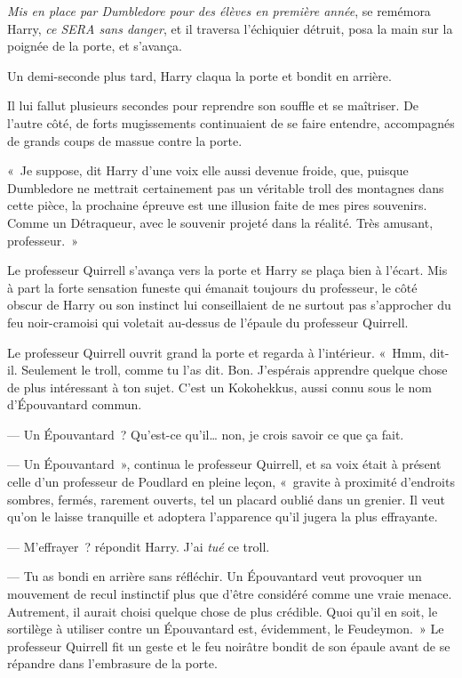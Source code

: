 \emph{Mis en place par Dumbledore pour des élèves en première année}, se remémora Harry, \emph{ce SERA sans danger}, et il traversa l'échiquier détruit, posa la main sur la poignée de la porte, et s'avança.

\later

Un demi-seconde plus tard, Harry claqua la porte et bondit en arrière.

Il lui fallut plusieurs secondes pour reprendre son souffle et se maîtriser.
De l'autre côté, de forts mugissements continuaient de se faire entendre, accompagnés de grands coups de massue contre la porte.

«~Je suppose, dit Harry d'une voix elle aussi devenue froide, que, puisque Dumbledore ne mettrait certainement pas un véritable troll des montagnes dans cette pièce, la prochaine épreuve est une illusion faite de mes pires souvenirs.
Comme un Détraqueur, avec le souvenir projeté dans la réalité.
Très amusant, professeur.~»

Le professeur Quirrell s'avança vers la porte et Harry se plaça bien à l'écart.
Mis à part la forte sensation funeste qui émanait toujours du professeur, le côté obscur de Harry ou son instinct lui conseillaient de ne surtout pas s'approcher du feu noir-cramoisi qui voletait au-dessus de l'épaule du professeur Quirrell.

Le professeur Quirrell ouvrit grand la porte et regarda à l'intérieur.
«~Hmm, dit-il.
Seulement le troll, comme tu l'as dit.
Bon. J'espérais apprendre quelque chose de plus intéressant à ton sujet.
C'est un Kokohekkus, aussi connu sous le nom d'Épouvantard commun.

--- Un Épouvantard~?
Qu'est-ce qu'il… non, je crois savoir ce que ça fait.

--- Un Épouvantard~», continua le professeur Quirrell, et sa voix était à présent celle d'un professeur de Poudlard en pleine leçon, «~gravite à proximité d'endroits sombres, fermés, rarement ouverts, tel un placard oublié dans un grenier.
Il veut qu'on le laisse tranquille et adoptera l'apparence qu'il jugera la plus effrayante.

--- M'effrayer~? répondit Harry.
J'ai \emph{tué} ce troll.

--- Tu as bondi en arrière sans réfléchir.
Un Épouvantard veut provoquer un mouvement de recul instinctif plus que d'être considéré comme une vraie menace.
Autrement, il aurait choisi quelque chose de plus crédible.
Quoi qu'il en soit, le sortilège à utiliser contre un Épouvantard est, évidemment, le Feudeymon.~»
Le professeur Quirrell fit un geste et le feu noirâtre bondit de son épaule avant de se répandre dans l'embrasure de la porte.

